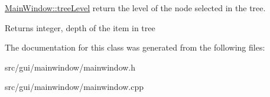 \hyperlink{classGui_1_1MainWindow_a382370c8f119d99d409b1b5708a3e846}{Main\+Window\+::tree\+Level} return the level of the node selected in the tree. 

\begin{DoxyReturn}{Returns}
integer, depth of the item in tree 
\end{DoxyReturn}


The documentation for this class was generated from the following files\+:\begin{DoxyCompactItemize}
\item 
src/gui/mainwindow/mainwindow.\+h\item 
src/gui/mainwindow/mainwindow.\+cpp\end{DoxyCompactItemize}
